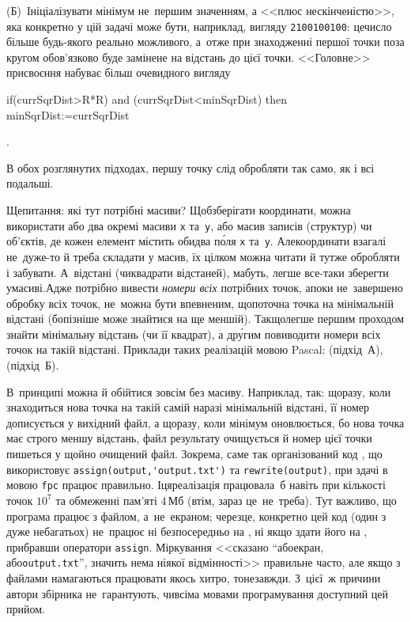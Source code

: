 (Б)~Ініціалізувати мінімум не~першим значенням, а <<плюс нескінченістю>>, яка конкретно у цій задачі може бути, наприклад, вигляду \texttt{2100100100}: це\nolinebreak[2] \mbox{число} більше будь-якого реально можливого, а~отже при знаходженні першої \mbox{точки} поза кругом обов'язково буде замінене на відстань до цієї точки. <<\mbox{Головне}>> присвоєння набуває більш очевидного вигляду \begin{ttfamily}{if\nolinebreak[2] (currSqrDist>R*R) and (currSqrDist<minSqrDist) then minSqrDist:=currSqrDist}\end{ttfamily}.

В обох розглянутих підходах, першу точку слід обробляти 
так само, як і всі подальші.

Ще\nolinebreak[3] питання: які тут потрібні масиви? Щоб\nolinebreak[2] зберігати координати, %
можна використати або два окремі масиви \texttt{x} та~\texttt{y}, або масив записів (структур) чи об'єктів, де кожен елемент містить обидва п\'{о}ля \texttt{x} та~\texttt{y}. Але\nolinebreak[2] координати взагалі не~дуже-то й треба складати у масив, їх цілком можна читати й тут\nolinebreak[3] же обробляти і забувати. 
А~відстані (чи\nolinebreak[2] квадрати відстаней), мабуть, легше все-таки зберегти у\nolinebreak[3] масиві.\linebreak[2] Адже потрібно вивести \emph{номери всіх} потрібних точок, а\nolinebreak[2] поки не~завершено обробку всіх точок, не~можна бути впевненим, що\nolinebreak[2] поточна точка на мінімальній відстані (бо\nolinebreak[3] пізніше може знайтися на ще меншій). Так\nolinebreak[3] що\nolinebreak[2] легше першим проходом знайти мінімальну відстань (чи її квадрат), а др\'{у}гим повиводити номери всіх точок на такій відстані.
%
Приклади таких реалізацій мовою Pascal:
\nolinebreak[2] (підхід~А),\linebreak[2]
\nolinebreak[2] (підхід~Б).

В~принципі можна й обійтися зовсім без масиву. Наприклад, так: щоразу, коли знаходиться нова точка на такій самій наразі мінімальній відстані, її номер дописується у вихідний файл, а щоразу, коли мінімум оновлюється, бо нова точка має строго меншу відстань, файл результату очищується й номер цієї точки пишеться у щойно очищений файл. Зокрема, саме так організований код , що використовує \verb"assign(output,'output.txt')" та \verb"rewrite(output)", при здачі в \EjudgeCkipoName{} мовою \verb"fpc" працює правильно. І\nolinebreak[3] ця\nolinebreak[2] реалізація працювала~б навіть при кількості точок $10^7$ та обмеженні пам'яті 4$\,$Мб (втім, зараз це~не~треба). Тут важливо, що програма працює з файлом, а~не~екраном; через\nolinebreak[2] це, конкретно цей код (один з дуже небагатьох) не~працює ні безпосередньо на \IdeOneName, ні якщо здати його на \EjudgeCkipoName, прибравши оператори \texttt{assign}. Міркування <<сказано ``або\nolinebreak[3] екран, або\nolinebreak[3] \texttt{output.txt}'', значить нема ніякої відмінності>> пра\-ви\-льне часто, але якщо з файлами намагаються працювати якось хитро, то\nolinebreak[3] не\nolinebreak[3] завжди. З~цієї~ж причини автори збірника не~гарантують, чи\nolinebreak[3] всіма мовами програмування доступний цей прийом.

